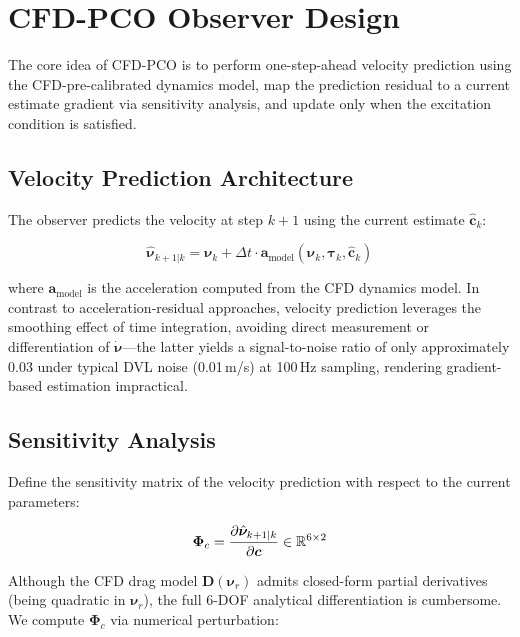\section{CFD-PCO Observer Design}

The core idea of CFD-PCO is to perform one-step-ahead velocity prediction using the CFD-pre-calibrated dynamics model, map the prediction residual to a current estimate gradient via sensitivity analysis, and update only when the excitation condition is satisfied.

\subsection{Velocity Prediction Architecture}

The observer predicts the velocity at step $k+1$ using the current estimate $\hat{\bm{c}}_k$:

\begin{equation}
    \hat{\bm{\nu}}_{k+1|k} = \bm{\nu}_k + \Delta t \cdot \bm{a}_{\text{model}}(\bm{\nu}_k, \bm{\tau}_k, \hat{\bm{c}}_k)
    \label{eq:prediction}
\end{equation}

where $\bm{a}_{\text{model}}$ is the acceleration computed from the CFD dynamics model. In contrast to acceleration-residual approaches, velocity prediction leverages the smoothing effect of time integration, avoiding direct measurement or differentiation of $\dot{\bm{\nu}}$---the latter yields a signal-to-noise ratio of only approximately 0.03 under typical DVL noise (0.01\,m/s) at 100\,Hz sampling, rendering gradient-based estimation impractical.

\subsection{Sensitivity Analysis}

Define the sensitivity matrix of the velocity prediction with respect to the current parameters:

\begin{equation}
    \bm{\Phi}_c = \frac{\partial \hat{\bm{\nu}}_{k+1|k}}{\partial \bm{c}} \in \mathbb{R}^{6\times 2}
    \label{eq:sensitivity}
\end{equation}

Although the CFD drag model $\bm{D}(\bm{\nu}_r)$ admits closed-form partial derivatives (being quadratic in $\bm{\nu}_r$), the full 6-DOF analytical differentiation is cumbersome. We compute $\bm{\Phi}_c$ via numerical perturbation:

